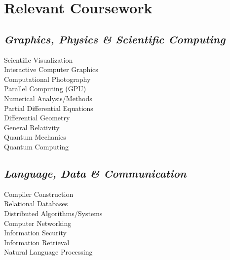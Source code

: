 \documentclass[11pt]{article}
\begin{document}
\begin{minipage}{250pt}
\section*{\sc Relevant Coursework}
\subsection*{\it Graphics, Physics \& Scientific Computing}
Scientific Visualization\\
Interactive Computer Graphics\\
Computational Photography\\
Parallel Computing (GPU)\\
Numerical Analysis/Methods\\
Partial Differential Equations\\
Differential Geometry\\
General Relativity\\
Quantum Mechanics\\
Quantum Computing

\subsection*{\it Language, Data \& Communication}
Compiler Construction\\
Relational Databases\\
Distributed Algorithms/Systems\\
Computer Networking\\
Information Security\\
Information Retrieval\\
Natural Language Processing

\end{minipage}
\end{document}
